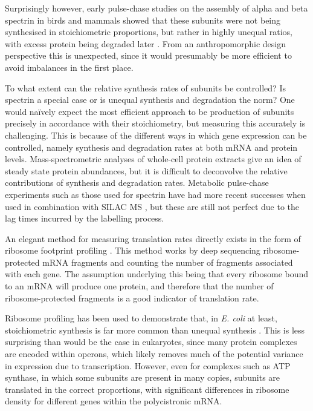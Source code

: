 \documentclass[a4paper,11pt,twoside,openright]{scrbook}
\begin{document}
Surprisingly however, early pulse-chase studies on the assembly of alpha and
beta spectrin in birds and mammals showed that these subunits were not being
synthesised in stoichiometric proportions, but rather in highly unequal ratios,
with excess protein being degraded later
\cite{Blikstad1983,Hanspal1987,Lehnert1988}. From an anthropomorphic design
perspective this is unexpected, since it would presumably be more efficient to
avoid imbalances in the first place.

To what extent can the relative synthesis rates of subunits be controlled? Is
spectrin a special case or is unequal synthesis and degradation the norm? One
would naïvely expect the most efficient approach to be production of subunits
precisely in accordance with their stoichiometry, but measuring this accurately
is challenging. This is because of the different ways in which gene expression
can be controlled, namely synthesis and degradation rates at both mRNA and
protein levels. Mass-spectrometric analyses of whole-cell protein extracts give
an idea of steady state protein abundances, but it is difficult to deconvolve
the relative contributions of synthesis and degradation rates. Metabolic
pulse-chase experiments such as those used for spectrin have had more recent
successes when used in combination with SILAC MS \cite{Schwanhausser2011}, but
these are still not perfect due to the lag times incurred by the labelling
process.

An elegant method for measuring translation rates directly exists in the form of
ribosome footprint profiling \cite{Ingolia2009,Ingolia2016}. This method works
by deep sequencing ribosome-protected mRNA fragments and counting the number of
fragments associated with each gene. The assumption underlying this being that
every ribosome bound to an mRNA will produce one protein, and therefore that the
number of ribosome-protected fragments is a good indicator of translation rate.

Ribosome profiling has been used to demonstrate that, in \textit{E. coli} at
least, stoichiometric synthesis is far more common than unequal synthesis
\cite{Li2014b}. This is less surprising than would be the case in eukaryotes,
since many protein complexes are encoded within operons, which likely removes
much of the potential variance in expression due to transcription. However, even
for complexes such as  ATP synthase, in which some subunits are
present in many copies, subunits are translated in the correct proportions, with
significant differences in ribosome density for different genes within the
polycistronic mRNA.
\end{document}

